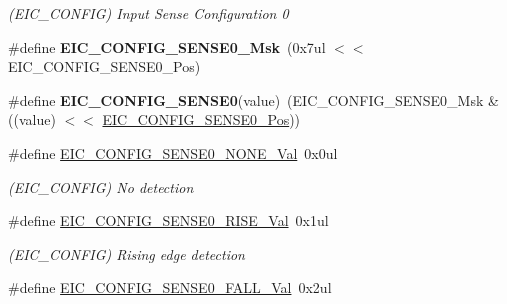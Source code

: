 \begin{DoxyCompactItemize}
\begin{DoxyCompactList}\small\item\em (E\+I\+C\+\_\+\+C\+O\+N\+F\+I\+G) Input Sense Configuration 0 \end{DoxyCompactList}\item 
\hypertarget{group___s_a_m_l21___e_i_c_gadd199a75cf7a674ddc1ffc8dc8246dc5}{}\#define {\bfseries E\+I\+C\+\_\+\+C\+O\+N\+F\+I\+G\+\_\+\+S\+E\+N\+S\+E0\+\_\+\+Msk}~(0x7ul $<$$<$ E\+I\+C\+\_\+\+C\+O\+N\+F\+I\+G\+\_\+\+S\+E\+N\+S\+E0\+\_\+\+Pos)\label{group___s_a_m_l21___e_i_c_gadd199a75cf7a674ddc1ffc8dc8246dc5}

\item 
\hypertarget{group___s_a_m_l21___e_i_c_ga5072e249ac60a58be9d31168eebf2aa6}{}\#define {\bfseries E\+I\+C\+\_\+\+C\+O\+N\+F\+I\+G\+\_\+\+S\+E\+N\+S\+E0}(value)~(E\+I\+C\+\_\+\+C\+O\+N\+F\+I\+G\+\_\+\+S\+E\+N\+S\+E0\+\_\+\+Msk \& ((value) $<$$<$ \hyperlink{group___s_a_m_l21___e_i_c_ga9a191a13be42b2e0283c890d9302f461}{E\+I\+C\+\_\+\+C\+O\+N\+F\+I\+G\+\_\+\+S\+E\+N\+S\+E0\+\_\+\+Pos}))\label{group___s_a_m_l21___e_i_c_ga5072e249ac60a58be9d31168eebf2aa6}

\item 
\hypertarget{group___s_a_m_l21___e_i_c_ga986d4e3fc22b167f6eb21a178ff4c45e}{}\#define \hyperlink{group___s_a_m_l21___e_i_c_ga986d4e3fc22b167f6eb21a178ff4c45e}{E\+I\+C\+\_\+\+C\+O\+N\+F\+I\+G\+\_\+\+S\+E\+N\+S\+E0\+\_\+\+N\+O\+N\+E\+\_\+\+Val}~0x0ul\label{group___s_a_m_l21___e_i_c_ga986d4e3fc22b167f6eb21a178ff4c45e}

\begin{DoxyCompactList}\small\item\em (E\+I\+C\+\_\+\+C\+O\+N\+F\+I\+G) No detection \end{DoxyCompactList}\item 
\hypertarget{group___s_a_m_l21___e_i_c_gadf381990c5471ceec041a27a028a51be}{}\#define \hyperlink{group___s_a_m_l21___e_i_c_gadf381990c5471ceec041a27a028a51be}{E\+I\+C\+\_\+\+C\+O\+N\+F\+I\+G\+\_\+\+S\+E\+N\+S\+E0\+\_\+\+R\+I\+S\+E\+\_\+\+Val}~0x1ul\label{group___s_a_m_l21___e_i_c_gadf381990c5471ceec041a27a028a51be}

\begin{DoxyCompactList}\small\item\em (E\+I\+C\+\_\+\+C\+O\+N\+F\+I\+G) Rising edge detection \end{DoxyCompactList}\item 
\hypertarget{group___s_a_m_l21___e_i_c_ga7fb62a57d10876d7cc1f6e22992c469d}{}\#define \hyperlink{group___s_a_m_l21___e_i_c_ga7fb62a57d10876d7cc1f6e22992c469d}{E\+I\+C\+\_\+\+C\+O\+N\+F\+I\+G\+\_\+\+S\+E\+N\+S\+E0\+\_\+\+F\+A\+L\+L\+\_\+\+Val}~0x2ul\label{group___s_a_m_l21___e_i_c_ga7fb62a57d10876d7cc1f6e22992c469d}


\end{DoxyCompactItemize}
